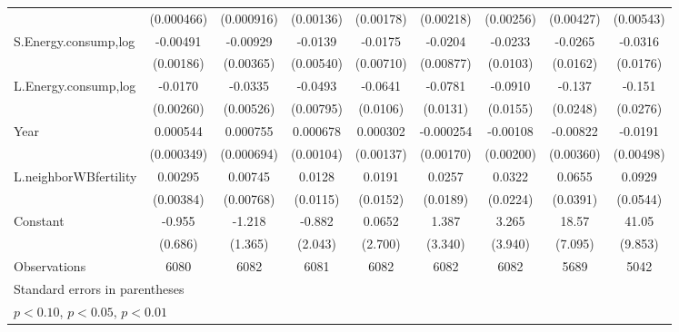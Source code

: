 \begin{table}[htbp]
\begin{tabular}{l*{8}{c}}
                    &  (0.000466)         &  (0.000916)         &   (0.00136)         &   (0.00178)         &   (0.00218)         &   (0.00256)         &   (0.00427)         &   (0.00543)         \\
[1em]
S.Energy.consump,log&    -0.00491\sym{***}&    -0.00929\sym{**} &     -0.0139\sym{**} &     -0.0175\sym{**} &     -0.0204\sym{**} &     -0.0233\sym{**} &     -0.0265         &     -0.0316\sym{*}  \\
                    &   (0.00186)         &   (0.00365)         &   (0.00540)         &   (0.00710)         &   (0.00877)         &    (0.0103)         &    (0.0162)         &    (0.0176)         \\
[1em]
L.Energy.consump,log&     -0.0170\sym{***}&     -0.0335\sym{***}&     -0.0493\sym{***}&     -0.0641\sym{***}&     -0.0781\sym{***}&     -0.0910\sym{***}&      -0.137\sym{***}&      -0.151\sym{***}\\
                    &   (0.00260)         &   (0.00526)         &   (0.00795)         &    (0.0106)         &    (0.0131)         &    (0.0155)         &    (0.0248)         &    (0.0276)         \\
[1em]
Year                &    0.000544         &    0.000755         &    0.000678         &    0.000302         &   -0.000254         &    -0.00108         &    -0.00822\sym{**} &     -0.0191\sym{***}\\
                    &  (0.000349)         &  (0.000694)         &   (0.00104)         &   (0.00137)         &   (0.00170)         &   (0.00200)         &   (0.00360)         &   (0.00498)         \\
[1em]
L.neighborWBfertility&     0.00295         &     0.00745         &      0.0128         &      0.0191         &      0.0257         &      0.0322         &      0.0655\sym{*}  &      0.0929\sym{*}  \\
                    &   (0.00384)         &   (0.00768)         &    (0.0115)         &    (0.0152)         &    (0.0189)         &    (0.0224)         &    (0.0391)         &    (0.0544)         \\
[1em]
Constant            &      -0.955         &      -1.218         &      -0.882         &      0.0652         &       1.387         &       3.265         &       18.57\sym{***}&       41.05\sym{***}\\
                    &     (0.686)         &     (1.365)         &     (2.043)         &     (2.700)         &     (3.340)         &     (3.940)         &     (7.095)         &     (9.853)         \\
\hline
Observations        &        6080         &        6082         &        6081         &        6082         &        6082         &        6082         &        5689         &        5042         \\
\hline\hline
\multicolumn{9}{l}{\footnotesize Standard errors in parentheses}\\
\multicolumn{9}{l}{\footnotesize \sym{*} \(p<0.10\), \sym{**} \(p<0.05\), \sym{***} \(p<0.01\)}\\
\end{tabular}
\end{table}
